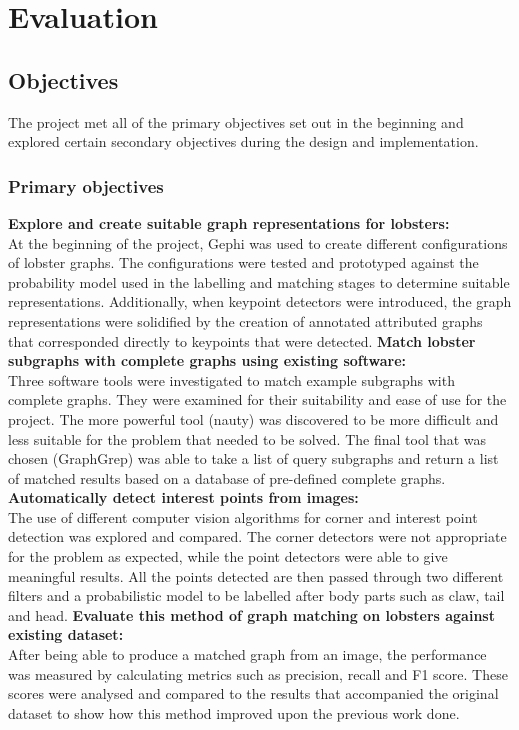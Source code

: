 \section{Evaluation}\label{sec:evaluation}

\subsection{Objectives}
The project met all of the primary objectives set out in the beginning and explored certain secondary objectives during the design and implementation. 
\subsubsection{Primary objectives}
\textbf{Explore and create suitable graph representations for lobsters:} \\
At the beginning of the project, Gephi was used to create different configurations of lobster graphs. The configurations were tested and prototyped against the probability model used in the labelling and matching stages to determine suitable representations. Additionally, when keypoint detectors were introduced, the graph representations were solidified by the creation of annotated attributed graphs that corresponded directly to keypoints that were detected. 
\n
\textbf{Match lobster subgraphs with complete graphs using existing software:} \\
Three software tools were investigated to match example subgraphs with complete graphs. They were examined for their suitability and ease of use for the project. The more powerful tool (nauty) was discovered to be more difficult and less suitable for the problem that needed to be solved. The final tool that was chosen (GraphGrep) was able to take a list of query subgraphs and return a list of matched results based on a database of pre-defined complete graphs. 
\n
\textbf{Automatically detect interest points from images:} \\
The use of different computer vision algorithms for corner and interest point detection was explored and compared. The corner detectors were not appropriate for the problem as expected, while the point detectors were able to give meaningful results. All the points detected are then passed through two different filters and a probabilistic model to be labelled after body parts such as claw, tail and head. 
\n
\textbf{Evaluate this method of graph matching on lobsters against existing dataset:} \\
After being able to produce a matched graph from an image, the performance was measured by calculating metrics such as precision, recall and F1 score. These scores were analysed and compared to the results that accompanied the original dataset to show how this method improved upon the previous work done. 


